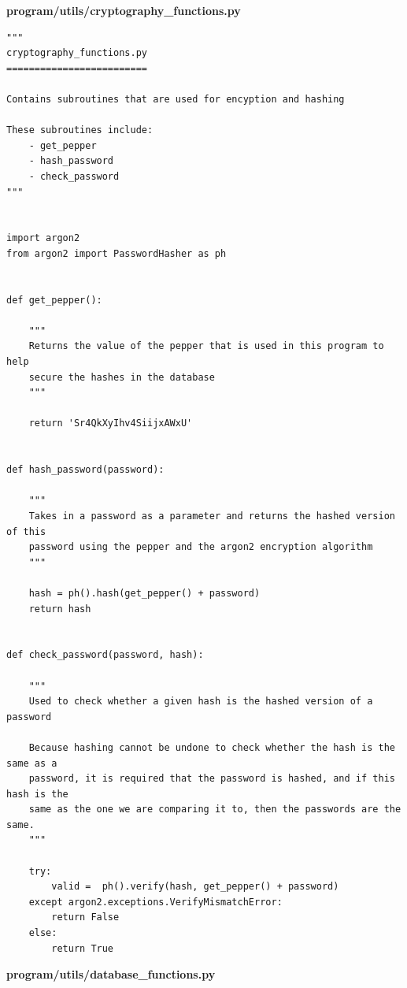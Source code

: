 \documentclass{article}
\begin{document}
\textbf{program/utils/cryptography\_functions.py}

\begin{lstlisting}
"""
cryptography_functions.py
=========================

Contains subroutines that are used for encyption and hashing

These subroutines include:
    - get_pepper
    - hash_password
    - check_password
"""


import argon2
from argon2 import PasswordHasher as ph


def get_pepper():

    """
    Returns the value of the pepper that is used in this program to help
    secure the hashes in the database
    """

    return 'Sr4QkXyIhv4SiijxAWxU'


def hash_password(password):

    """
    Takes in a password as a parameter and returns the hashed version of this
    password using the pepper and the argon2 encryption algorithm
    """

    hash = ph().hash(get_pepper() + password)
    return hash


def check_password(password, hash):

    """
    Used to check whether a given hash is the hashed version of a password

    Because hashing cannot be undone to check whether the hash is the same as a
    password, it is required that the password is hashed, and if this hash is the
    same as the one we are comparing it to, then the passwords are the same.
    """

    try:
        valid =  ph().verify(hash, get_pepper() + password)
    except argon2.exceptions.VerifyMismatchError:
        return False
    else:
        return True
\end{lstlisting}


\textbf{program/utils/database\_functions.py}
\end{document}
